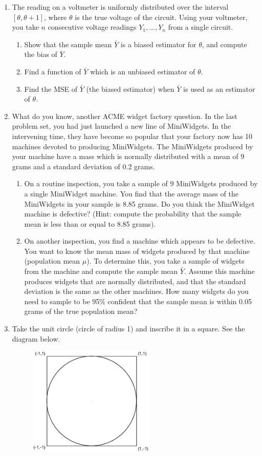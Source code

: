 \documentclass[12pt]{article}
\begin{document}
\begin{enumerate}
\item The reading on a voltmeter is uniformly distributed over the interval $[\theta, \theta+1]$, where $\theta$ is the true voltage of the circuit. Using your voltmeter, you take $n$ consecutive voltage readings $Y_1, \dots, Y_n$ from a single circuit.
\begin{enumerate}
\item Show that the sample mean $\bar{Y}$ is a biased estimator for $\theta$, and compute the bias of $\bar{Y}$.
\item Find a function of $\bar{Y}$ which is an unbiased estimator of $\theta$.
\item Find the MSE of $\bar{Y}$ (the biased estimator) when $\bar{Y}$ is used as an estimator of $\theta$.
\end{enumerate}

\item What do you know, another ACME widget factory question. In the last problem set, you had just launched a new line of MiniWidgets. In the intervening time, they have become so popular that your factory now has 10 machines devoted to producing MiniWidgets. The MiniWidgets produced by your machine have a mass which is normally distributed with a mean of 9 grams and a standard deviation of 0.2 grams.
\begin{enumerate}
\item On a routine inspection, you take a sample of 9 MiniWidgets produced by a single MiniWidget machine. You find that the average mass of the MiniWidgets in your sample is 8.85 grams. Do you think the MiniWidget machine is defective? (Hint: compute the probability that the sample mean is less than or equal to 8.85 grams).
\item On another inspection, you find a machine which appears to be defective. You want to know the mean mass of widgets produced by that machine (population mean $\mu$). To determine this, you take a sample of widgets from the machine and compute the sample mean $\bar{Y}$. Assume this machine produces widgets that are normally distributed, and that the standard deviation is the same as the other machines. How many widgets do you need to sample to be 95\% confident that the sample mean is within 0.05 grams of the true population mean?
\end{enumerate}

\item Take the unit circle (circle of radius 1) and inscribe it in a square. See the diagram below.

\begin{figure}[H]
\centering
\includegraphics[width=6cm]{squarecircle.eps}
\end{figure}


\end{enumerate}
\end{document}
